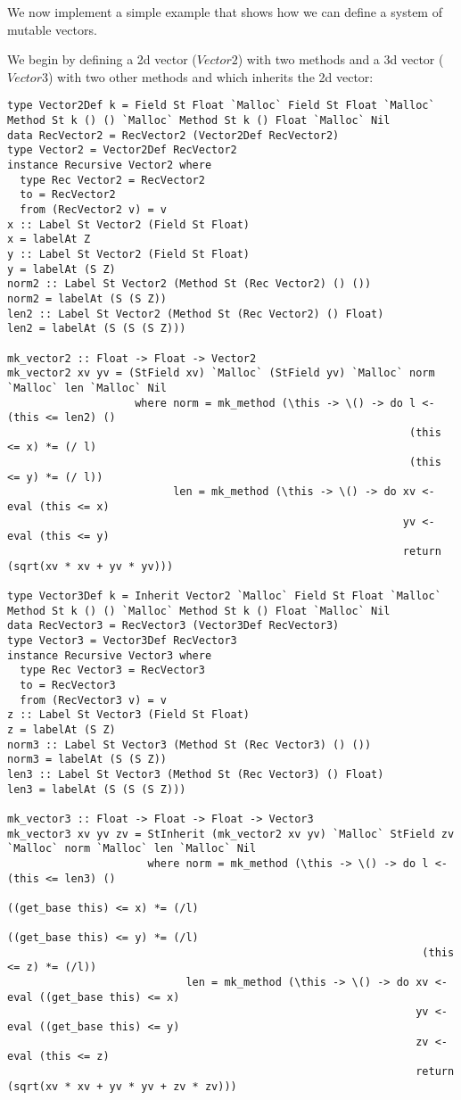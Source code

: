 We now implement a simple example that shows how we can define a system of mutable vectors.

We begin by defining a 2d vector ($Vector2$) with two methods and a 3d vector ($Vector3$) with two other methods and which inherits the 2d vector:
\begin{lstlisting}
type Vector2Def k = Field St Float `Malloc` Field St Float `Malloc` Method St k () () `Malloc` Method St k () Float `Malloc` Nil
data RecVector2 = RecVector2 (Vector2Def RecVector2)
type Vector2 = Vector2Def RecVector2
instance Recursive Vector2 where
  type Rec Vector2 = RecVector2
  to = RecVector2
  from (RecVector2 v) = v
x :: Label St Vector2 (Field St Float)
x = labelAt Z
y :: Label St Vector2 (Field St Float)
y = labelAt (S Z)
norm2 :: Label St Vector2 (Method St (Rec Vector2) () ())
norm2 = labelAt (S (S Z))
len2 :: Label St Vector2 (Method St (Rec Vector2) () Float)
len2 = labelAt (S (S (S Z)))

mk_vector2 :: Float -> Float -> Vector2
mk_vector2 xv yv = (StField xv) `Malloc` (StField yv) `Malloc` norm `Malloc` len `Malloc` Nil
                    where norm = mk_method (\this -> \() -> do l <- (this <= len2) ()
                                                               (this <= x) *= (/ l)
                                                               (this <= y) *= (/ l))
                          len = mk_method (\this -> \() -> do xv <- eval (this <= x)
                                                              yv <- eval (this <= y)
                                                              return (sqrt(xv * xv + yv * yv)))

type Vector3Def k = Inherit Vector2 `Malloc` Field St Float `Malloc` Method St k () () `Malloc` Method St k () Float `Malloc` Nil
data RecVector3 = RecVector3 (Vector3Def RecVector3)
type Vector3 = Vector3Def RecVector3
instance Recursive Vector3 where
  type Rec Vector3 = RecVector3
  to = RecVector3
  from (RecVector3 v) = v
z :: Label St Vector3 (Field St Float)
z = labelAt (S Z)
norm3 :: Label St Vector3 (Method St (Rec Vector3) () ())
norm3 = labelAt (S (S Z))
len3 :: Label St Vector3 (Method St (Rec Vector3) () Float)
len3 = labelAt (S (S (S Z)))

mk_vector3 :: Float -> Float -> Float -> Vector3
mk_vector3 xv yv zv = StInherit (mk_vector2 xv yv) `Malloc` StField zv `Malloc` norm `Malloc` len `Malloc` Nil
                      where norm = mk_method (\this -> \() -> do l <- (this <= len3) ()
                                                                 ((get_base this) <= x) *= (/l)
                                                                 ((get_base this) <= y) *= (/l)
                                                                 (this <= z) *= (/l)) 
                            len = mk_method (\this -> \() -> do xv <- eval ((get_base this) <= x)
                                                                yv <- eval ((get_base this) <= y)
                                                                zv <- eval (this <= z)
                                                                return (sqrt(xv * xv + yv * yv + zv * zv)))


\end{lstlisting}
